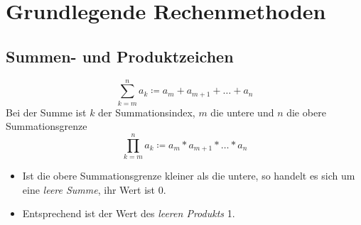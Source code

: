 \chapter{Grundlegende Rechenmethoden}
\section{Summen- und Produktzeichen}
\begin{equation*}
  \sum\limits_{k=m}^n a_k\coloneqq a_m + a_{m+1} + \ldots + a_n
\end{equation*}
Bei der Summe ist $k$ der Summationsindex, $m$ die untere und $n$ die obere Summationsgrenze
\begin{equation*}
  \prod\limits_{k=m}^n a_k\coloneqq a_m * a_{m+1} * \ldots * a_n
\end{equation*}

\bemerkung
\begin{itemize}
  \item Ist die obere Summationsgrenze kleiner als die untere, so handelt es sich um eine \emph{leere Summe}, ihr Wert ist 0.
  \item Entsprechend ist der Wert des \emph{leeren Produkts} 1.
\end{itemize}
